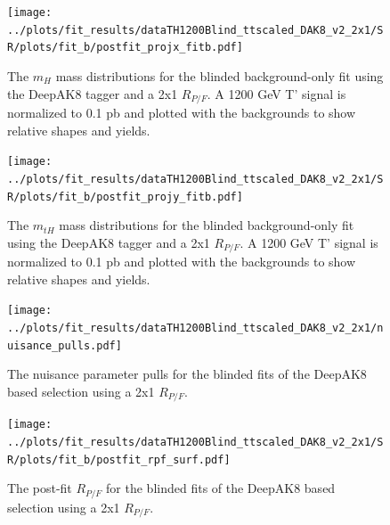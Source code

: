 \documentclass[10pt,oneside]{article}
\begin{document}
\begin{figure}[H]
    \centering
    \texttt{[image: ../plots/fit\_results/dataTH1200Blind\_ttscaled\_DAK8\_v2\_2x1/SR/plots/fit\_b/postfit\_projx\_fitb.pdf]}
    \caption{The $m_H$ mass distributions for the blinded background-only fit using the DeepAK8 tagger and a 2x1 $R_{P/F}$.
    A 1200 GeV T' signal is normalized to 0.1 pb and plotted with the backgrounds to show relative shapes and yields.}
    \label{figs:DAK8_mh_2x1}
\end{figure}
\begin{figure}[H]
    \centering
    \texttt{[image: ../plots/fit\_results/dataTH1200Blind\_ttscaled\_DAK8\_v2\_2x1/SR/plots/fit\_b/postfit\_projy\_fitb.pdf]}
    \caption{The $m_{tH}$ mass distributions for the blinded background-only fit using the DeepAK8 tagger and a 2x1 $R_{P/F}$.
    A 1200 GeV T' signal is normalized to 0.1 pb and plotted with the backgrounds to show relative shapes and yields.}
    \label{figs:DAK8_mth_2x1}
\end{figure}
\begin{figure}[H]
    \centering
    \texttt{[image: ../plots/fit\_results/dataTH1200Blind\_ttscaled\_DAK8\_v2\_2x1/nuisance\_pulls.pdf]}
    \caption{The nuisance parameter pulls for the blinded fits of the DeepAK8 based selection using a 2x1 $R_{P/F}$.}
    \label{figs:DAK8_nuis_2x1}
\end{figure}
\begin{figure}[H]
    \centering
    \texttt{[image: ../plots/fit\_results/dataTH1200Blind\_ttscaled\_DAK8\_v2\_2x1/SR/plots/fit\_b/postfit\_rpf\_surf.pdf]}
    \caption{The post-fit $R_{P/F}$ for the blinded fits of the DeepAK8 based selection using a 2x1 $R_{P/F}$.}
    \label{figs:DAK8_rpf_2x1}
\end{figure}
\end{document}
